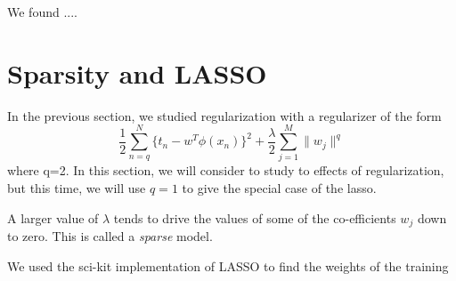 \documentclass[11pt]{article}
\newcommand{\?}[0]{\vert}
\begin{document}
We found ....



\section{Sparsity and LASSO}

In the previous section, we studied regularization with a regularizer of the form
$$\frac{1}{2} \sum_{n=q}^{N} \{t_n-w^T\phi(x_n)\}^2 + \frac{\lambda}{2} \sum_{j=1}^{M} \|w_j\|^q$$
where q=2. In this section, we will consider to study to effects of regularization, but this time, we will use $q=1$ to give the special case of the lasso. 

A larger value of $\lambda$ tends to drive the values of some of the co-efficients $w_j$ down to zero. This is called a \textit{sparse} model.

We used the sci-kit implementation of LASSO to find the weights of the training
\end{document}
